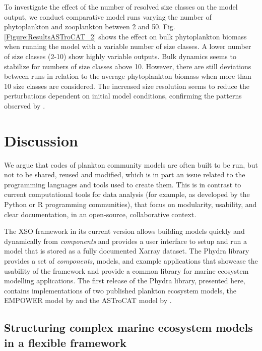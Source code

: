 \documentclass[gmd, manuscript]{copernicus}
\begin{document}
To investigate the effect of the number of resolved size classes on the model output, we conduct comparative model runs varying the number of phytoplankton and zooplankton between 2 and 50.
Fig. \ref{Figure:ResultsASTroCAT_2} shows the effect on bulk phytoplankton biomass when running the model with a variable number of size classes. A lower number of size classes (2-10) show highly variable outputs. Bulk dynamics seems to stabilize for numbers of size classes above 10. However, there are still deviations between runs in relation to the average phytoplankton biomass when more than 10 size classes are considered. The increased size resolution seems to reduce the perturbations dependent on initial model conditions, confirming the patterns observed by \citet{Baird2010IncreasingErrors}.



\section{Discussion}

We argue that codes of plankton community models are often built to be run, but not to be shared, reused and modified, which is in part an issue related to the programming languages and tools used to create them. This is in contrast to current computational tools for data analysis (for example, as developed by the Python or R programming communities), that focus on modularity, usability, and clear documentation, in an open-source, collaborative context. 

The XSO framework in its current version allows building models quickly and dynamically from \textit{components} and provides a user interface to setup and run a model that is stored as a fully documented Xarray dataset. The Phydra library provides a set of \textit{components}, models, and example applications that showcase the usability of the framework and provide a common library for marine ecosystem modelling applications. 
The first release of the Phydra library, presented here, contains implementations of two published plankton ecosystem models, the EMPOWER model by \citet{Anderson2015c} and the ASTroCAT model by \citet{Banas2011b}.


\subsection{Structuring complex marine ecosystem models in a flexible framework}
\end{document}
